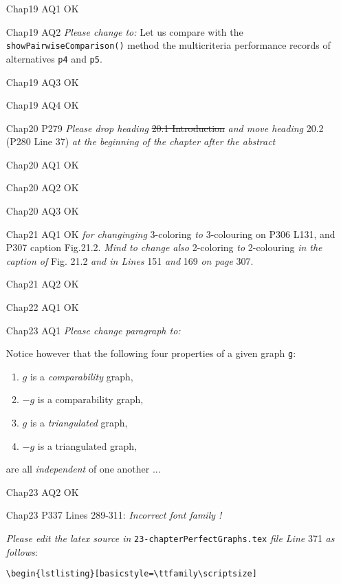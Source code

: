 \documentclass[english]{article}
\begin{document}
\begin{itemize}
\vspace{\baselineskip}
\item [Chap19 AQ1] OK 
\item [Chap19 AQ2] \emph{Please change to:} Let us compare with the \texttt{showPairwiseComparison()} method the multicriteria performance records of alternatives \texttt{p4} and \texttt{p5}.
\item [Chap19 AQ3] OK 
\item [Chap19 AQ4] OK 

\vspace{\baselineskip}
\item [Chap20 P279] \emph{Please drop heading} \st{20.1 Introduction} \emph{and move heading} 20.2 (P280 Line 37) \emph{at the beginning of the chapter after the abstract}
\item [Chap20 AQ1] OK 
\item [Chap20 AQ2] OK 
\item [Chap20 AQ3] OK 

\vspace{\baselineskip}
\item [Chap21 AQ1] OK \emph{for changinging} 3-coloring \emph{to} 3-colouring on P306 L131, and P307 caption Fig.21.2. \emph{Mind to change also} 2-coloring \emph{to} 2-colouring \emph{in the caption of} Fig. 21.2 \emph{and in Lines} 151 \emph{and} 169 \emph{on page} 307.
\item [Chap21 AQ2] OK  

\vspace{\baselineskip}
\item [Chap22 AQ1] OK 

\vspace{\baselineskip}
\item [Chap23 AQ1] \emph{Please change paragraph to:}
  
  Notice however that the following four properties of a given graph \texttt{g}:
  \begin{enumerate}
    \item $g$ is a \emph{comparability} graph,
    \item $-g$ is a comparability graph,
    \item $g$ is a \emph{triangulated} graph,
    \item $-g$ is a triangulated graph,
  \end{enumerate}
  are all \emph{independent} of one another ...

\item [Chap23 AQ2] OK
\item [Chap23 P337] Lines 289-311: \emph{Incorrect font family !}

    \emph{Please edit the latex source in} \texttt{23-chapterPerfectGraphs.tex} \emph{file Line} 371 \emph{as follows}:
  
  \verb+\begin{lstlisting}[basicstyle=\ttfamily\scriptsize]+
\end{itemize}

\end{document}

